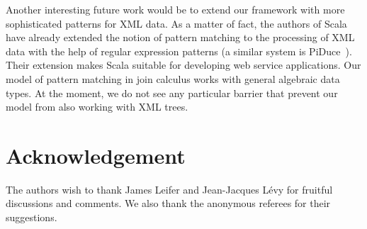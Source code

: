 \documentclass{LMCS}
\newcommand{\scala}{\textrm{Scala}\xspace}
\renewcommand{\_}{\mathord{\rule[-.25ex]{1ex}{.15ex}}}
\begin{document}
Another interesting future work would be to extend our framework with
more sophisticated patterns for XML data. As a matter of fact, the
authors of \scala have already extended the notion of pattern matching
to the processing of XML data with the help of regular expression
patterns (a similar system is \textrm{PiDuce}~\cite{PiDuce:2005}).  Their
extension makes \scala suitable for developing web service
applications. Our model of pattern matching in join calculus works
with general algebraic data types. At the moment, we do not see any
particular barrier that prevent our model from also working with XML
trees.


\section*{Acknowledgement}
The authors wish to thank James Leifer and Jean-Jacques L\'{e}vy for
fruitful discussions and comments.
We also thank the anonymous referees for their suggestions.



\end{document}

